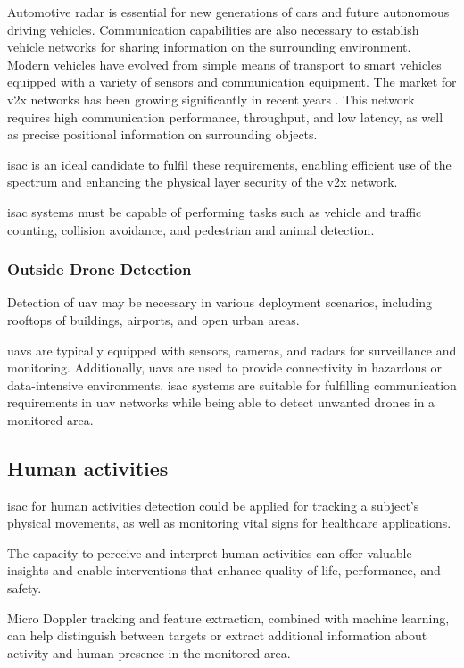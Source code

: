	Automotive radar is essential for new generations of cars and future autonomous driving vehicles.
	Communication capabilities are also necessary to establish vehicle networks for sharing information on the surrounding environment.
	Modern vehicles have evolved from simple means of transport to smart vehicles equipped with a variety of sensors and communication equipment.
	The market for \gls{v2x} networks has been growing significantly in recent years \cite{Liu_Masouros_2021}.
	This network requires high communication performance, throughput, and low latency, as well as precise positional information on surrounding objects.
	
	\gls{isac} is an ideal candidate to fulfil these requirements, enabling efficient use of the spectrum and enhancing the physical layer security of the \gls{v2x} network.
	
	\gls{isac} systems must be capable of performing tasks such as vehicle and traffic counting, collision avoidance, and pedestrian and animal detection.
	
	\subsubsection{Outside Drone Detection}
	
	Detection of \gls{uav} may be necessary in various deployment scenarios, including rooftops of buildings, airports, and open urban areas.
	
	\glspl{uav} are typically equipped with sensors, cameras, and radars for surveillance and monitoring. Additionally, \glspl{uav} are used to provide connectivity in hazardous or data-intensive environments.
	\gls{isac} systems are suitable for fulfilling communication requirements in \gls{uav} networks while being able to detect unwanted drones in a monitored area.
	
	\subsection{Human activities}
	
	\Gls{isac} for human activities detection could be applied for tracking a subject's physical movements, as well as monitoring vital signs for healthcare applications. 
	
	The capacity to perceive and interpret human activities can offer valuable insights and enable interventions that enhance quality of life, performance, and safety.
	
	Micro Doppler tracking and feature extraction, combined with machine learning, can help distinguish between targets or extract additional information about activity and human presence in the monitored area.
	

